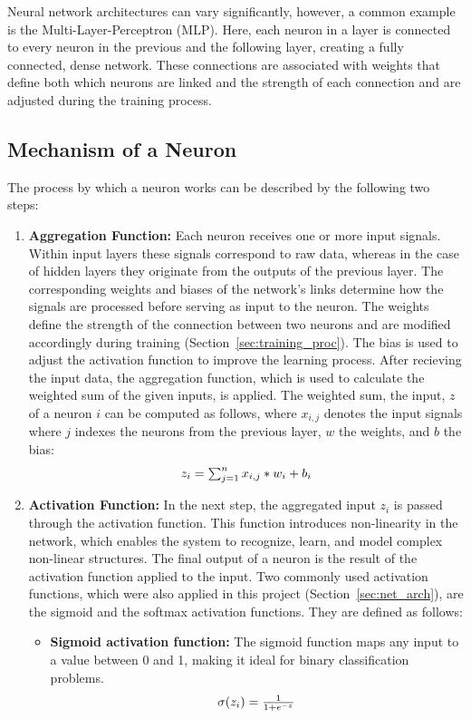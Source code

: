 \documentclass[12pt,fleqn,a4paper]{article}
\begin{document}
Neural network architectures can vary significantly, however, a common example is the Multi-Layer-Perceptron (MLP). Here, each neuron in a layer is connected to every neuron in the previous and the following layer, creating a fully connected, dense network. These connections are associated with weights that define both which neurons are linked and the strength of each connection and are adjusted during the training process.


\subsection{Mechanism of a Neuron}
The process by which a neuron works can be described by the following two steps:
 \begin{enumerate}
 \item \textbf{Aggregation Function:} Each neuron receives one or more input signals. Within input layers these signals correspond to raw data, whereas in the case of hidden layers they originate from the outputs of the previous layer. The corresponding weights and biases of the network's links determine how the signals are processed before serving as input to the neuron. The weights define the strength of the connection between two neurons and are modified accordingly during training (Section~\ref{sec:training_proc}). The bias is used to adjust the activation function to improve the learning process. 
After recieving the input data, the aggregation function, which is used to calculate the weighted sum of the given inputs, is applied. The weighted sum, the input, $z$ of a neuron $i$ can be computed as follows, where $x_{i,j}$ denotes the input signals where $j$ indexes the neurons from the previous layer, $w$ the weights, and $b$ the bias: 
\begin{equation}
$$z_i = \sum_{j=1}^n x_{i,j}* w_i +b_i$$
\label{eq:weighted_sum}
\end{equation}

 \item \textbf{Activation Function:} In the next step, the aggregated input $z_i$ is passed through the activation function. This function introduces non-linearity in the network, which enables the system to recognize, learn, and model complex non-linear structures. The final output of a neuron is the result of the activation function applied to the input. Two commonly used activation functions, which were also applied in this project (Section~\ref{sec:net_arch}), are the sigmoid and the softmax activation functions. They are defined as follows:
\begin{itemize}
\item \textbf{Sigmoid activation function:} The sigmoid function maps any input to a value between 0 and 1, making it ideal for binary classification problems. 
\begin{equation}
$$\sigma(z_i)=\frac{1}{1+e^{-z}}$$
\label{eq:sigmoid_act}
\end{equation}


\end{itemize}
\end{enumerate}
\end{document}
